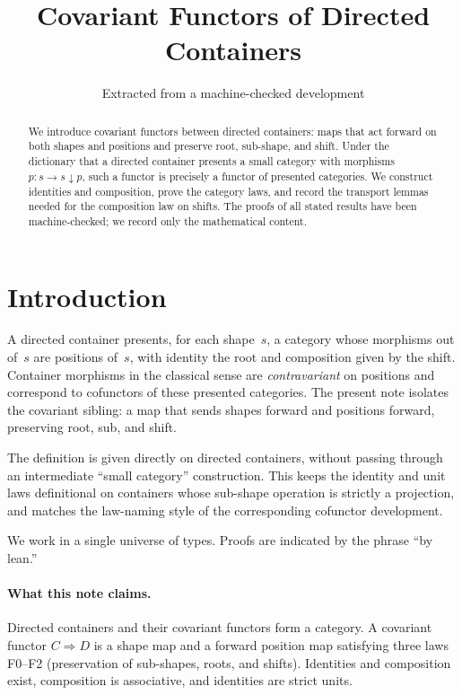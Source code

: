 \documentclass[11pt,a4paper]{article}
\title{Covariant Functors of Directed Containers}
\author{Extracted from a machine-checked development}
\date{}
\theoremstyle{plain}
\theoremstyle{definition}
\begin{document}
\maketitle

\begin{abstract}
We introduce covariant functors between directed containers: maps that act
forward on both shapes and positions and preserve root, sub-shape, and shift.
Under the dictionary that a directed container presents a small category with
morphisms $p : s \to s \downarrow p$, such a functor is precisely a functor of
presented categories. We construct identities and composition, prove the
category laws, and record the transport lemmas needed for the composition law
on shifts. The proofs of all stated results have been machine-checked; we
record only the mathematical content.
\end{abstract}

\tableofcontents
\bigskip

\section{Introduction}

A directed container presents, for each shape~$s$, a category whose morphisms
out of~$s$ are positions of~$s$, with identity the root and composition given
by the shift. Container morphisms in the classical sense are
\emph{contravariant} on positions and correspond to cofunctors of these
presented categories. The present note isolates the covariant sibling: a map
that sends shapes forward and positions forward, preserving root, sub, and
shift.

The definition is given directly on directed containers, without passing
through an intermediate ``small category'' construction. This keeps the
identity and unit laws definitional on containers whose sub-shape operation is
strictly a projection, and matches the law-naming style of the corresponding
cofunctor development.

We work in a single universe of types. Proofs are indicated by the phrase
``by lean.''

\paragraph{What this note claims.}
Directed containers and their covariant functors form a category. A covariant
functor $C \Rightarrow D$ is a shape map and a forward position map satisfying
three laws F0--F2 (preservation of sub-shapes, roots, and shifts). Identities
and composition exist, composition is associative, and identities are strict
units.
\end{document}
